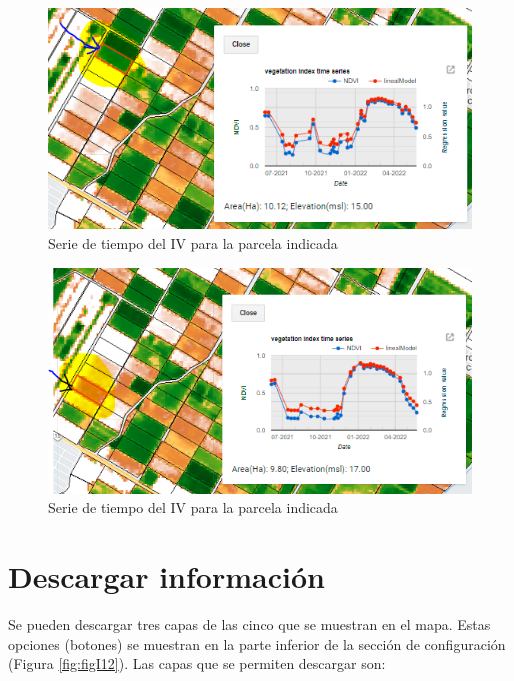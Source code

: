 \documentclass[
]{book}
\begin{document}
\begin{figure}

{\centering \includegraphics{./images/Figure60} 

}

\caption{Serie de tiempo del IV para la parcela indicada}\label{fig:figI10}
\end{figure}
\begin{figure}

{\centering \includegraphics{./images/Figure61} 

}

\caption{Serie de tiempo del IV para la parcela indicada}\label{fig:figI11}
\end{figure}

\hypertarget{descargar-informaciuxf3n}{%
\section{Descargar información}\label{descargar-informaciuxf3n}}

Se pueden descargar tres capas de las cinco que se muestran en el mapa. Estas opciones (botones) se muestran en la parte inferior de la sección de configuración (Figura \ref{fig:figI12}). Las capas que se permiten descargar son:
\end{document}

